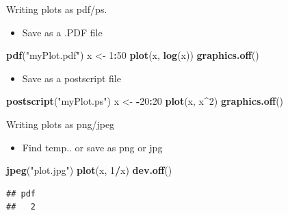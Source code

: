 \documentclass[ignorenonframetext,]{beamer}
\newenvironment{Shaded}{\begin{snugshade}}{\end{snugshade}}
\newcommand{\KeywordTok}[1]{\textcolor[rgb]{0.13,0.29,0.53}{\textbf{#1}}}
\newcommand{\DecValTok}[1]{\textcolor[rgb]{0.00,0.00,0.81}{#1}}
\newcommand{\StringTok}[1]{\textcolor[rgb]{0.31,0.60,0.02}{#1}}
\newcommand{\OperatorTok}[1]{\textcolor[rgb]{0.81,0.36,0.00}{\textbf{#1}}}
\newcommand{\NormalTok}[1]{#1}
\providecommand{\tightlist}{%
  \setlength{\itemsep}{0pt}\setlength{\parskip}{0pt}}
\begin{document}
\begin{frame}[fragile]{Writing plots as pdf/ps.}

\begin{itemize}
\tightlist
\item
  Save as a .PDF file
\end{itemize}

\begin{Shaded}
\begin{Highlighting}[]
\KeywordTok{pdf}\NormalTok{(}\StringTok{"myPlot.pdf"}\NormalTok{)}
\NormalTok{x <-}\StringTok{ }\DecValTok{1}\OperatorTok{:}\DecValTok{50}
\KeywordTok{plot}\NormalTok{(x, }\KeywordTok{log}\NormalTok{(x))}
\KeywordTok{graphics.off}\NormalTok{()}
\end{Highlighting}
\end{Shaded}

\begin{itemize}
\tightlist
\item
  Save as a postscript file
\end{itemize}

\begin{Shaded}
\begin{Highlighting}[]
\KeywordTok{postscript}\NormalTok{(}\StringTok{"myPlot.ps"}\NormalTok{)}
\NormalTok{x <-}\StringTok{ }\OperatorTok{-}\DecValTok{20}\OperatorTok{:}\DecValTok{20}
\KeywordTok{plot}\NormalTok{(x, x}\OperatorTok{^}\DecValTok{2}\NormalTok{)}
\KeywordTok{graphics.off}\NormalTok{()}
\end{Highlighting}
\end{Shaded}

\end{frame}

\begin{frame}[fragile]{Writing plots as png/jpeg}

\begin{itemize}
\tightlist
\item
  Find temp.. or save as png or jpg
\end{itemize}

\begin{Shaded}
\begin{Highlighting}[]
\KeywordTok{jpeg}\NormalTok{(}\StringTok{"plot.jpg"}\NormalTok{)}
\KeywordTok{plot}\NormalTok{(x, }\DecValTok{1}\OperatorTok{/}\NormalTok{x)}
\KeywordTok{dev.off}\NormalTok{()}
\end{Highlighting}
\end{Shaded}

\begin{verbatim}
## pdf 
##   2
\end{verbatim}

\end{frame}
\end{document}
